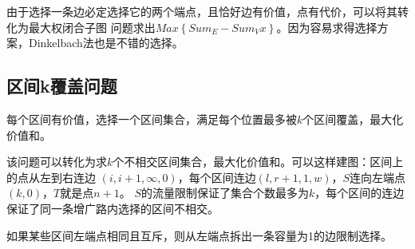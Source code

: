 由于选择一条边必定选择它的两个端点，且恰好边有价值，点有代价，可以将其转化为最大权闭合子图
问题求出$Max\left\{Sum_E-Sum_Vx\right\}$。因为容易求得选择方案，Dinkelbach法也是不错的选择。

\subsection{区间k覆盖问题}
每个区间有价值，选择一个区间集合，满足每个位置最多被$k$个区间覆盖，最大化价值和。

该问题可以转化为求$k$个不相交区间集合，最大化价值和。可以这样建图：区间上的点从左到右连边
$(i,i+1,\infty,0)$，每个区间连边$(l,r+1,1,w)$，$S$连向左端点$(k,0)$，$T$就是点$n+1$。
$S$的流量限制保证了集合个数最多为$k$，每个区间的连边保证了同一条增广路内选择的区间不相交。

如果某些区间左端点相同且互斥，则从左端点拆出一条容量为1的边限制选择。
